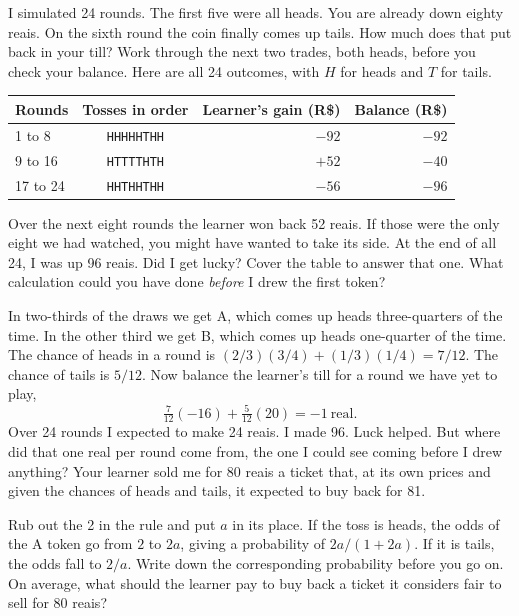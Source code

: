 I simulated 24 rounds. The first five were all heads. You are already down eighty reais. On the sixth round the coin finally comes up tails. How much does that put back in your till? Work through the next two trades, both heads, before you check your balance. Here are all 24 outcomes, with $H$ for heads and $T$ for tails.
\begin{center}
{\small
\begin{tabular}{@{}lcrr@{}}
\toprule
Rounds & Tosses in order & Learner's gain (R\$) & Balance (R\$) \\
\midrule
1 to 8 & \texttt{HHHHHTHH} & $-92$ & $-92$ \\
9 to 16 & \texttt{HTTTTHTH} & $+52$ & $-40$ \\
17 to 24 & \texttt{HHTHHTHH} & $-56$ & $-96$ \\
\bottomrule
\end{tabular}}
\end{center}
Over the next eight rounds the learner won back 52 reais. If those were the only eight we had watched, you might have wanted to take its side. At the end of all 24, I was up 96 reais. Did I get lucky? Cover the table to answer that one. What calculation could you have done \emph{before} I drew the first token?

In two-thirds of the draws we get A, which comes up heads three-quarters of the time. In the other third we get B, which comes up heads one-quarter of the time. The chance of heads in a round is $(2/3)(3/4)+(1/3)(1/4)=7/12$. The chance of tails is $5/12$. Now balance the learner's till for a round we have yet to play,
\[
    \tfrac{7}{12}(-16)+\tfrac{5}{12}(20)=-1\ \text{real}.
\]
Over 24 rounds I expected to make 24 reais. I made 96. Luck helped. But where did that one real per round come from, the one I could see coming before I drew anything? Your learner sold me for 80 reais a ticket that, at its own prices and given the chances of heads and tails, it expected to buy back for 81.

Rub out the 2 in the rule and put $a$ in its place. If the toss is heads, the odds of the A token go from $2$ to $2a$, giving a probability of $2a/(1+2a)$. If it is tails, the odds fall to $2/a$. Write down the corresponding probability before you go on. On average, what should the learner pay to buy back a ticket it considers fair to sell for 80 reais?

